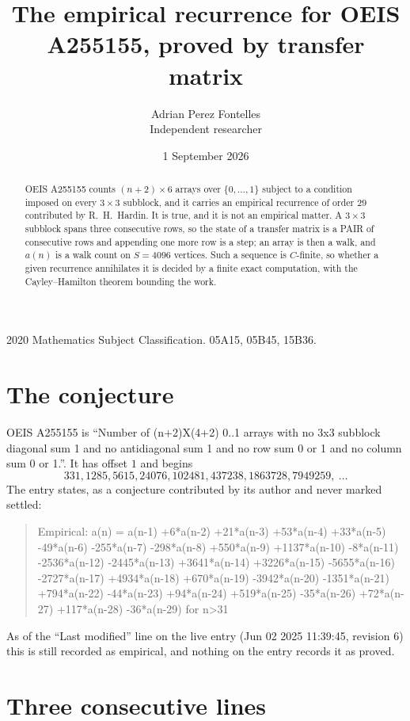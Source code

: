 \documentclass[11pt,a4paper]{article}
\title{The empirical recurrence for OEIS A255155, proved by transfer matrix}
\author{Adrian Perez Fontelles\\ \small Independent researcher}
\date{1 September 2026}
\theoremstyle{plain}
\theoremstyle{definition}
\begin{document}
\maketitle

\begin{abstract}
OEIS A255155 counts $(n+2)\times6$ arrays over $\{0,\dots,1\}$ subject to a condition imposed on
every $3\times3$ subblock, and it carries an empirical recurrence of order $29$
contributed by R.~H.~Hardin. It is true, and it is not an empirical matter. A $3\times3$
subblock spans three consecutive rows, so the state of a transfer matrix is a PAIR of
consecutive rows and appending one more row is a step; an array is then a walk, and
$a(n)$ is a walk count on $S=4096$ vertices. Such a sequence is $C$-finite, so whether a given
recurrence annihilates it is decided by a finite exact computation, with the Cayley--Hamilton
theorem bounding the work.
\end{abstract}

\noindent\small 2020 Mathematics Subject Classification. 05A15, 05B45, 15B36.\normalsize

\section{The conjecture}

OEIS A255155 is ``Number of (n+2)X(4+2) 0..1 arrays with no 3x3 subblock diagonal sum 1 and no antidiagonal sum 1 and no row sum 0 or 1 and no column sum 0 or 1.''. It has offset $1$ and begins
\[
331, 1285, 5615, 24076, 102481, 437238, 1863728, 7949259,\ \dots
\]
The entry states, as a conjecture contributed by its author and never marked settled:
\begin{quote}
Empirical: a(n) = a(n-1) +6*a(n-2) +21*a(n-3) +53*a(n-4) +33*a(n-5) -49*a(n-6) -255*a(n-7) -298*a(n-8) +550*a(n-9) +1137*a(n-10) -8*a(n-11) -2536*a(n-12) -2445*a(n-13) +3641*a(n-14) +3226*a(n-15) -5655*a(n-16) -2727*a(n-17) +4934*a(n-18) +670*a(n-19) -3942*a(n-20) -1351*a(n-21) +794*a(n-22) -44*a(n-23) +94*a(n-24) +519*a(n-25) -35*a(n-26) +72*a(n-27) +117*a(n-28) -36*a(n-29) for n>31
\end{quote}
As of the ``Last modified'' line on the live entry (Jun 02 2025 11:39:45, revision 6) this is still
recorded as empirical, and nothing on the entry records it as proved.

\section{Three consecutive lines}
\end{document}
